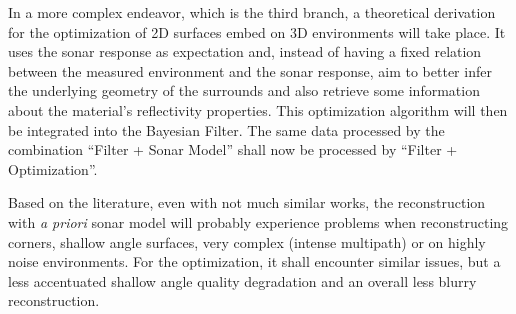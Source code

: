 In a more complex endeavor, which is the third branch, a theoretical derivation
for the optimization of 2D surfaces embed on 3D environments will take place.
It uses the sonar response as expectation and, instead of having a fixed
relation between the measured environment and the sonar response, aim to better
infer the underlying geometry of the surrounds and also retrieve some
information about the material's reflectivity properties.
This optimization algorithm will then be integrated into the Bayesian Filter. The
same data processed by the combination ``Filter + Sonar Model'' shall now be
processed by ``Filter + Optimization''.
 
Based on the literature, even with not much similar works, the reconstruction
with \textit{a priori} sonar model will probably experience problems when
reconstructing corners, shallow angle surfaces, very complex (intense multipath)
or on highly noise environments. For the optimization, it shall encounter
similar issues, but a less accentuated shallow angle quality degradation and an
overall less blurry reconstruction.
